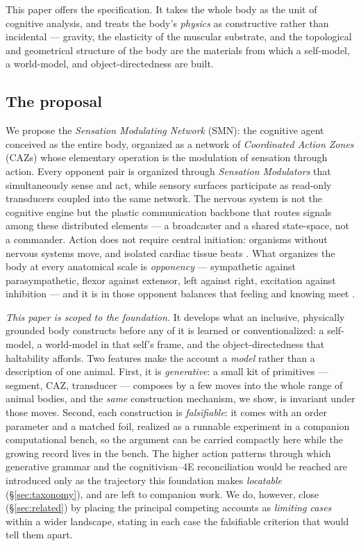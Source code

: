 \documentclass{article}
\begin{document}
This paper offers the specification.  It takes the whole body as the unit
of cognitive analysis, and treats the body's \emph{physics} as
constructive rather than incidental --- gravity, the elasticity of the
muscular substrate, and the topological and geometrical structure of the
body are the materials from which a self-model, a world-model, and
object-directedness are built.

\subsection*{The proposal}

We propose the \emph{Sensation Modulating Network} (SMN): the cognitive
agent conceived as the entire body, organized as a network of
\emph{Coordinated Action Zones} (CAZs) whose elementary operation is the
modulation of sensation through action.  Every opponent pair is organized
through \emph{Sensation Modulators} that simultaneously sense and act,
while sensory surfaces participate as read-only transducers coupled into
the same network.  The nervous system is not the cognitive engine but the
plastic communication backbone that routes signals among these
distributed elements --- a broadcaster and a shared state-space, not a
commander.  Action does not require central initiation: organisms without
nervous systems move, and isolated cardiac tissue beats
\citep{Llinas2001-xl,Levin2014MolecularBioelectricity}.  What organizes
the body at every anatomical scale is \emph{opponency} --- sympathetic
against parasympathetic, flexor against extensor, left against right,
excitation against inhibition --- and it is in those opponent balances
that feeling and knowing meet
\citep{Damasio1999_Feeling,Damasio2010_Self,Damasio2021_FeelingKnowing}.

\emph{This paper is scoped to the foundation.}  It develops what an
inclusive, physically grounded body constructs before any of it is
learned or conventionalized: a self-model, a world-model in that self's
frame, and the object-directedness that haltability affords.  Two
features make the account a \emph{model} rather than a description of one
animal.  First, it is \emph{generative}: a small kit of primitives ---
segment, CAZ, transducer --- composes by a few moves into the whole
range of animal bodies, and the \emph{same} construction mechanism, we
show, is invariant under those moves.  Second, each construction is
\emph{falsifiable}: it comes with an order parameter and a matched foil,
realized as a runnable experiment in a companion computational bench, so
the argument can be carried compactly here while the growing record lives
in the bench.  The higher action patterns through which generative
grammar and the cognitivism--4E reconciliation would be reached are
introduced only as the trajectory this foundation makes \emph{locatable}
(\S\ref{sec:taxonomy}), and are left to companion work.  We do, however,
close (\S\ref{sec:related}) by placing the principal competing accounts
as \emph{limiting cases} within a wider landscape, stating in each case the
falsifiable criterion that would tell them apart.
\end{document}

